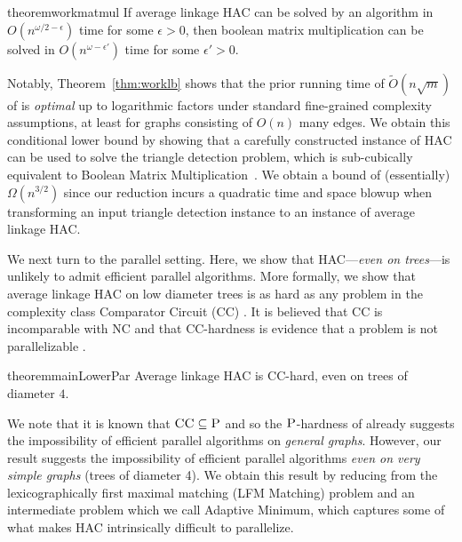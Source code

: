 \documentclass[11pt]{article}
\newcommand{\am}{\textsf{Adaptive Minimum}\xspace}
\newcommand{\lfm}{\textsf{LFM Matching}\xspace}
\newcommand{\CC}{\textsc{CC}\xspace}
\newcommand{\NC}{\textsc{NC}\xspace}
\newcommand{\PTime}{\textsc{P}\xspace}
\begin{document}
\begin{restatable}{theorem}{workmatmul}\label{cor:workmatmul}
If average linkage HAC can be solved by an algorithm in $O(n^{\omega/2-\epsilon})$ time for some $\epsilon > 0$, then boolean matrix multiplication can be solved in $O(n^{\omega - \epsilon'})$ time for some $\epsilon' > 0$.
\end{restatable}

\noindent 
Notably, Theorem~\ref{thm:worklb} shows that the prior running time of $\tilde{O}(n \sqrt{m})$ of \cite{dhulipala2021hierarchical} is {\em optimal} up to logarithmic factors under standard fine-grained complexity assumptions, at least for graphs consisting of $O(n)$ many edges.
We obtain this conditional lower bound by showing that a carefully constructed instance of HAC can be used to solve the triangle detection problem, which is sub-cubically equivalent to Boolean Matrix Multiplication~\cite{williams2010subcubic}.
We obtain a bound of (essentially) $\Omega(n^{3/2})$ since our reduction incurs a quadratic time and space blowup when transforming an input triangle detection instance to an instance of average linkage HAC.

We next turn to the parallel setting. 
Here, we show that HAC---\emph{even on trees}---is unlikely to admit efficient parallel algorithms. 
More formally, we show that average linkage HAC on low diameter trees is as hard as any problem in the complexity class Comparator Circuit (\CC) \cite{subramanian1989new, cook2014complexity}. 
It is believed that \CC is incomparable with \NC and that \CC-hardness is evidence that a problem is not parallelizable \cite{mayr1992complexity, cook2014complexity}.
\begin{restatable}{theorem}{mainLowerPar}\label{thm:mainLowerPar}
Average linkage HAC is \CC-hard, even on trees of diameter $4$.
\end{restatable}
\noindent We note that it is known that $\CC \subseteq \PTime$ and so the $\PTime$-hardness of \cite{dhulipala2022hierarchical} already suggests the impossibility of efficient parallel algorithms on \emph{general graphs}. 
However, our result suggests the impossibility of efficient parallel algorithms \emph{even on very simple graphs} (trees of diameter 4).
We obtain this result by reducing from the lexicographically first maximal matching (\lfm) problem and an intermediate problem which we call \am, which captures some of what makes HAC intrinsically difficult to parallelize.
\end{document}

